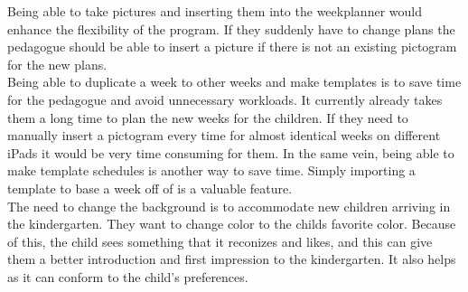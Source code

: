 Being able to take pictures and inserting them into the weekplanner would enhance the flexibility of the program.
If they suddenly have to change plans the pedagogue should be able to insert a picture if there is not an existing pictogram for the new plans.
\\
Being able to duplicate a week to other weeks and make templates is to save time for the pedagogue and avoid unnecessary workloads. 
It currently already takes them a long time to plan the new weeks for the children. 
If they need to manually insert a pictogram every time for almost identical weeks on different iPads it would be very time consuming for them.
In the same vein, being able to make template schedules is another way to save time. 
Simply importing a template to base a week off of is a valuable feature.
\\
The need to change the background is to accommodate new children arriving in the kindergarten. 
They want to change color to the childs favorite color. 
Because of this, the child sees something that it reconizes and likes, and this can give them a better introduction and first impression to the kindergarten.
It also helps as it can conform to the child's preferences.
